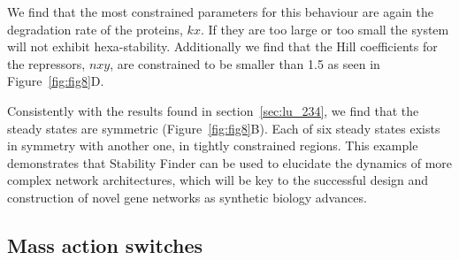 We find that the most constrained parameters for this behaviour are again the degradation rate of the proteins, $kx$. If they are too large or too small the system will not exhibit hexa-stability. Additionally we find that the Hill coefficients for the repressors, $nxy$, are constrained to be smaller than 1.5 as seen in Figure~\ref{fig:fig8}D. 

Consistently with the results found in section~\ref{sec:lu_234}, we find that the steady states are symmetric (Figure~\ref{fig:fig8}B). Each of six steady states exists in symmetry with another one, in tightly constrained regions. This example demonstrates that Stability Finder can be used to elucidate the dynamics of more complex network architectures, which will be key to the successful design and construction of novel gene networks as synthetic biology advances.



\subsection{Mass action switches}
\label{sec:ma_sw}						

